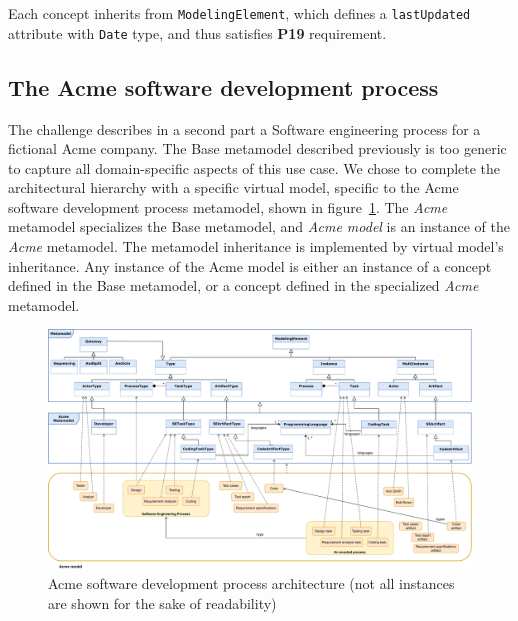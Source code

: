 Each concept inherits from \texttt{ModelingElement}, which defines a \texttt{lastUpdated} attribute with \texttt{Date} type, and thus satisfies \textbf{P19} requirement.

\subsection{The Acme software development process}
\label{sec:AcmeSoftwareDevelopmentProcess}

The challenge describes in a second part a Software engineering process for a fictional Acme company. The Base metamodel described previously is too generic to capture all domain-specific aspects of this use case. We chose to complete the architectural hierarchy with a specific virtual model, specific to the Acme software development process metamodel, shown in figure~\ref{fig:AcmeFullArchitecture}.
The \textit{Acme} metamodel specializes the Base metamodel, and \textit{Acme model} is an instance of the \textit{Acme} metamodel. The metamodel inheritance is implemented by virtual model's inheritance. Any instance of the Acme model is either an instance of a concept defined in the Base metamodel, or a concept defined in the specialized \textit{Acme} metamodel.


\begin{figure}
 \centering
     \includegraphics[width=1.0 \textwidth]{Figures/AcmeFullArchitecture.pdf}
     \caption{Acme software development process architecture (not all instances are shown for the sake of readability)}
    \label{fig:AcmeFullArchitecture}
\end{figure}

